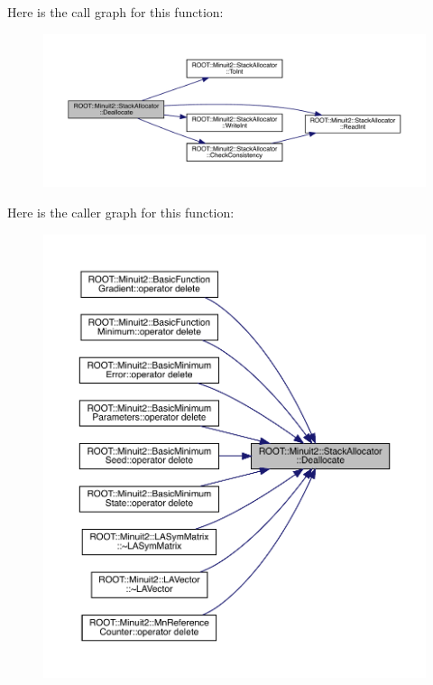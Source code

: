 Here is the call graph for this function\+:
\nopagebreak
\begin{figure}[H]
\begin{center}
\leavevmode
\includegraphics[width=350pt]{d3/d1e/classROOT_1_1Minuit2_1_1StackAllocator_ac36426e01e1474491cef1b203dba2f0c_cgraph}
\end{center}
\end{figure}
Here is the caller graph for this function\+:\nopagebreak
\begin{figure}[H]
\begin{center}
\leavevmode
\includegraphics[width=350pt]{d3/d1e/classROOT_1_1Minuit2_1_1StackAllocator_ac36426e01e1474491cef1b203dba2f0c_icgraph}
\end{center}
\end{figure}
\mbox{\label{classROOT_1_1Minuit2_1_1StackAllocator_ac36426e01e1474491cef1b203dba2f0c}} 
